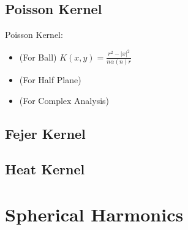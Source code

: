 \documentclass[Total.tex]{subfiles}
\begin{document}
			\section{Poisson Kernel}
				\begin{Def} Poisson Kernel:
					\begin{itemize}
						\item (For Ball) $K(x,y)=\frac{r^2-|x|^2}{n\alpha(n)r}$
						\item (For Half Plane)
						\item (For Complex Analysis)
					\end{itemize}
				\end{Def}
			\section{Fejer Kernel}
				
			\section{Heat Kernel}
			
			
		\chapter{Spherical Harmonics}
\end{document}
